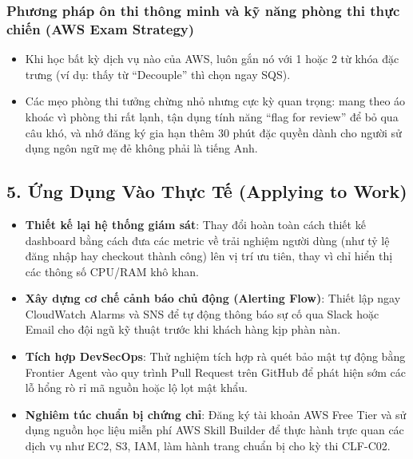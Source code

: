 \hypertarget{phux1b0ux1a1ng-phuxe1p-uxf4n-thi-thuxf4ng-minh-vuxe0-kux1ef9-nux103ng-phuxf2ng-thi-thux1ef1c-chiux1ebfn-aws-exam-strategy}{%
\subsubsection{Phương pháp ôn thi thông minh và kỹ năng phòng thi thực
chiến (AWS Exam
Strategy)}}

\begin{itemize}
\tightlist
\item
  Khi học bất kỳ dịch vụ nào của AWS, luôn gắn nó với 1 hoặc 2 từ khóa
  đặc trưng (ví dụ: thấy từ ``Decouple'' thì chọn ngay SQS).
\item
  Các mẹo phòng thi tưởng chừng nhỏ nhưng cực kỳ quan trọng: mang theo
  áo khoác vì phòng thi rất lạnh, tận dụng tính năng ``flag for review''
  để bỏ qua câu khó, và nhớ đăng ký gia hạn thêm 30 phút đặc quyền dành
  cho người sử dụng ngôn ngữ mẹ đẻ không phải là tiếng Anh.
\end{itemize}

\hypertarget{ux1ee9ng-dux1ee5ng-vuxe0o-thux1ef1c-tux1ebf-applying-to-work}{%
\subsection{5. Ứng Dụng Vào Thực Tế (Applying to
Work)}}

\begin{itemize}
\tightlist
\item
  \textbf{Thiết kế lại hệ thống giám sát}: Thay đổi hoàn toàn cách thiết
  kế dashboard bằng cách đưa các metric về trải nghiệm người dùng (như
  tỷ lệ đăng nhập hay checkout thành công) lên vị trí ưu tiên, thay vì
  chỉ hiển thị các thông số CPU/RAM khô khan.
\item
  \textbf{Xây dựng cơ chế cảnh báo chủ động (Alerting Flow)}: Thiết lập
  ngay CloudWatch Alarms và SNS để tự động thông báo sự cố qua Slack
  hoặc Email cho đội ngũ kỹ thuật trước khi khách hàng kịp phàn nàn.
\item
  \textbf{Tích hợp DevSecOps}: Thử nghiệm tích hợp rà quét bảo mật tự
  động bằng Frontier Agent vào quy trình Pull Request trên GitHub để
  phát hiện sớm các lỗ hổng rò rỉ mã nguồn hoặc lộ lọt mật khẩu.
\item
  \textbf{Nghiêm túc chuẩn bị chứng chỉ}: Đăng ký tài khoản AWS Free
  Tier và sử dụng nguồn học liệu miễn phí AWS Skill Builder để thực hành
  trực quan các dịch vụ như EC2, S3, IAM, làm hành trang chuẩn bị cho kỳ
  thi CLF-C02.
\end{itemize}

